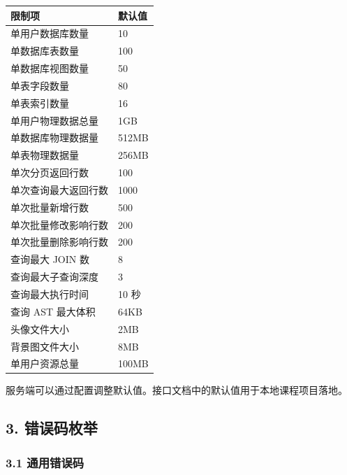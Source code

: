 \documentclass[
  a4paper,
  UTF8]{ctexart}
\begin{document}
\begin{longtable}[]{@{}ll@{}}
\toprule
限制项 & 默认值 \\
\midrule
\endhead
单用户数据库数量 & 10 \\
单数据库表数量 & 100 \\
单数据库视图数量 & 50 \\
单表字段数量 & 80 \\
单表索引数量 & 16 \\
单用户物理数据总量 & 1GB \\
单数据库物理数据量 & 512MB \\
单表物理数据量 & 256MB \\
单次分页返回行数 & 100 \\
单次查询最大返回行数 & 1000 \\
单次批量新增行数 & 500 \\
单次批量修改影响行数 & 200 \\
单次批量删除影响行数 & 200 \\
查询最大 JOIN 数 & 8 \\
查询最大子查询深度 & 3 \\
查询最大执行时间 & 10 秒 \\
查询 AST 最大体积 & 64KB \\
头像文件大小 & 2MB \\
背景图文件大小 & 8MB \\
单用户资源总量 & 100MB \\
\bottomrule
\end{longtable}

服务端可以通过配置调整默认值。接口文档中的默认值用于本地课程项目落地。

\hypertarget{ux9519ux8befux7801ux679aux4e3e}{%
\subsection{3. 错误码枚举}\label{ux9519ux8befux7801ux679aux4e3e}}

\hypertarget{ux901aux7528ux9519ux8befux7801}{%
\subsubsection{3.1 通用错误码}\label{ux901aux7528ux9519ux8befux7801}}
\end{document}
